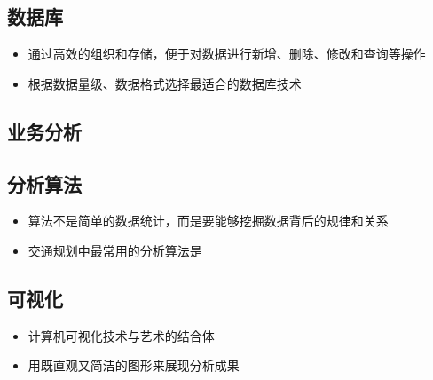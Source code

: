 \subsection{数据库}
\begin{frame}[t]{}
\begin{itemize}
\item<1-> 通过高效的组织和存储，便于对数据进行新增、删除、修改和查询等操作
\item<2-> 根据数据量级、数据格式选择最适合的数据库技术
\end{itemize}
\end{frame}

\subsection{业务分析}


\subsection{分析算法}
\begin{frame}[t]{}
\begin{itemize}
\item<1-> 算法不是简单的数据统计，而是要能够挖掘数据背后的规律和关系
\item<2-> 交通规划中最常用的分析算法是
\end{itemize}

\end{frame}


\subsection{可视化}
\begin{frame}[t]{\subsecname}
\begin{itemize}
\item<1-> 计算机可视化技术与艺术的结合体
\item<2-> 用既直观又简洁的图形来展现分析成果
\end{itemize}

\end{frame}

